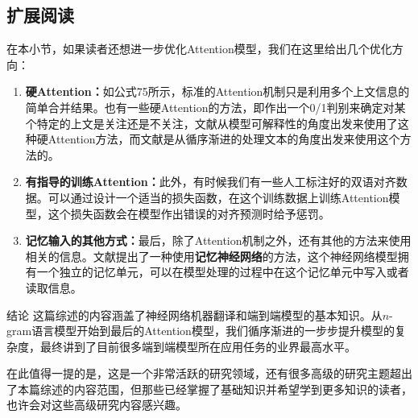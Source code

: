 \documentclass[10pt,a4paper]{ctexart}
\makeatletter
\renewcommand{\section}{\@startsection{section}{1}{0mm}
  {-\baselineskip}{0.5\baselineskip}{\bf\leftline}}
\makeatother
\begin{document}
\subsection{扩展阅读}
在本小节，如果读者还想进一步优化Attention模型，我们在这里给出几个优化方向：
\begin{enumerate}
\item[] \textbf{硬Attention：}如公式75所示，标准的Attention机制只是利用多个上文信息的简单合并结果。也有一些硬Attention的方法，即作出一个0/1判别来确定对某个特定的上文是关注还是不关注，文献\cite{lei2016rationalizing}从模型可解释性的角度出发来使用了这种硬Attention方法，而文献\cite{yu2016online,gu2016learning}是从循序渐进的处理文本的角度出发来使用这个方法的。
\item[] \textbf{有指导的训练Attention：}此外，有时候我们有一些人工标注好的双语对齐数据。可以通过设计一个适当的损失函数，在这个训练数据上训练Attention模型，这个损失函数会在模型作出错误的对齐预测时给予惩罚\cite{mi2016supervised}。
\item[] \textbf{记忆输入的其他方式：}最后，除了Attention机制之外，还有其他的方法来使用相关的信息。文献\cite{wang2016memory}提出了一种使用\textbf{记忆神经网络}的方法，这个神经网络模型拥有一个独立的记忆单元，可以在模型处理的过程中在这个记忆单元中写入或者读取信息。
\end{enumerate}


\section{结论}
这篇综述的内容涵盖了神经网络机器翻译和端到端模型的基本知识。从$n$-gram语言模型开始到最后的Attention模型，我们循序渐进的一步步提升模型的复杂度，最终讲到了目前很多端到端模型所在应用任务的业界最高水平。

在此值得一提的是，这是一个非常活跃的研究领域，还有很多高级的研究主题超出了本篇综述的内容范围，但那些已经掌握了基础知识并希望学到更多知识的读者，也许会对这些高级研究内容感兴趣。
\end{document}
